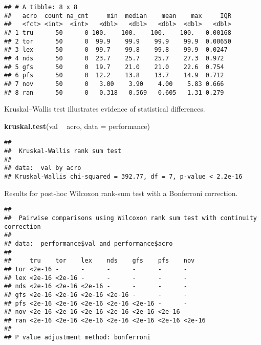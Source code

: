 \documentclass[]{book}
\newenvironment{Shaded}{\begin{snugshade}}{\end{snugshade}}
\newcommand{\DataTypeTok}[1]{\textcolor[rgb]{0.13,0.29,0.53}{#1}}
\newcommand{\KeywordTok}[1]{\textcolor[rgb]{0.13,0.29,0.53}{\textbf{#1}}}
\newcommand{\NormalTok}[1]{#1}
\newcommand{\OperatorTok}[1]{\textcolor[rgb]{0.81,0.36,0.00}{\textbf{#1}}}
\newcommand{\OtherTok}[1]{\textcolor[rgb]{0.56,0.35,0.01}{#1}}
\newcommand{\StringTok}[1]{\textcolor[rgb]{0.31,0.60,0.02}{#1}}
\begin{document}
\begin{verbatim}
## # A tibble: 8 x 8
##   acro  count na_cnt     min  median    mean    max     IQR
##   <fct> <int>  <int>   <dbl>   <dbl>   <dbl>  <dbl>   <dbl>
## 1 tru      50      0 100.    100.    100.    100.   0.00168
## 2 tor      50      0  99.9    99.9    99.9    99.9  0.00650
## 3 lex      50      0  99.7    99.8    99.8    99.9  0.0247 
## 4 nds      50      0  23.7    25.7    25.7    27.3  0.972  
## 5 gfs      50      0  19.7    21.0    21.0    22.6  0.754  
## 6 pfs      50      0  12.2    13.8    13.7    14.9  0.712  
## 7 nov      50      0   3.00    3.90    4.00    5.83 0.666  
## 8 ran      50      0   0.318   0.569   0.605   1.31 0.279
\end{verbatim}

Kruskal--Wallis test illustrates evidence of statistical differences.

\begin{Shaded}
\begin{Highlighting}[]
\KeywordTok{kruskal.test}\NormalTok{(val }\OperatorTok{~}\StringTok{ }\NormalTok{acro, }\DataTypeTok{data =}\NormalTok{ performance)}
\end{Highlighting}
\end{Shaded}

\begin{verbatim}
## 
##  Kruskal-Wallis rank sum test
## 
## data:  val by acro
## Kruskal-Wallis chi-squared = 392.77, df = 7, p-value < 2.2e-16
\end{verbatim}

Results for post-hoc Wilcoxon rank-sum test with a Bonferroni correction.

\begin{Shaded}
\end{Shaded}

\begin{verbatim}
## 
##  Pairwise comparisons using Wilcoxon rank sum test with continuity correction 
## 
## data:  performance$val and performance$acro 
## 
##     tru    tor    lex    nds    gfs    pfs    nov   
## tor <2e-16 -      -      -      -      -      -     
## lex <2e-16 <2e-16 -      -      -      -      -     
## nds <2e-16 <2e-16 <2e-16 -      -      -      -     
## gfs <2e-16 <2e-16 <2e-16 <2e-16 -      -      -     
## pfs <2e-16 <2e-16 <2e-16 <2e-16 <2e-16 -      -     
## nov <2e-16 <2e-16 <2e-16 <2e-16 <2e-16 <2e-16 -     
## ran <2e-16 <2e-16 <2e-16 <2e-16 <2e-16 <2e-16 <2e-16
## 
## P value adjustment method: bonferroni
\end{verbatim}
\end{document}
